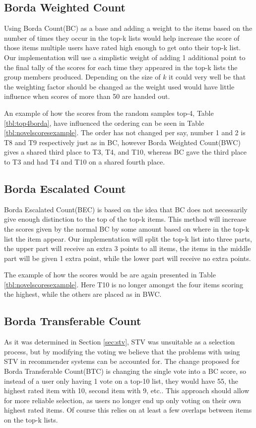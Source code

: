 \subsection{Borda Weighted Count}
Using Borda Count(BC) as a base and adding a weight to the items based on the number of times they occur in the top-k lists would help increase the score of those items multiple users have rated high enough to get onto their top-k list. Our implementation will use a simplistic weight of adding 1 additional point to the final tally of the scores for each time they appeared in the top-k lists the group members produced. Depending on the size of $k$ it could very well be that the weighting factor should be changed as the weight used would have little influence when scores of more than 50 are handed out.

An example of how the scores from the random samples top-4, Table \ref{tbl:top4borda}, have influenced the ordering can be seen in Table \ref{tbl:novelscoresexample}. The order has not changed per say, number 1 and 2 is T8 and T9 respectively just as in BC, however Borda Weighted Count(BWC) gives a shared third place to T3, T4, and T10, whereas BC gave the third place to T3 and had T4 and T10 on a shared fourth place. 

\subsection{Borda Escalated Count}
Borda Escalated Count(BEC) is based on the idea that BC does not necessarily give enough distinction to the top of the top-k items. This method will increase the scores given by the normal BC by some amount based on where in the top-k list the item appear. Our implementation will split the top-k list into three parts, the upper part will receive an extra 3 points to all items, the items in the middle part will be given 1 extra point, while the lower part will receive no extra points.

The example of how the scores would be are again presented in Table \ref{tbl:novelscoresexample}. Here T10 is no longer amongst the four items scoring the highest, while the others are placed as in BWC.

\subsection{Borda Transferable Count} \label{BTC}
As it was determined in Section \ref{sec:stv}, STV was unsuitable as a selection process, but by modifying the voting we believe that the problems with using STV in recommender systems can be accounted for. The change proposed for Borda Transferable Count(BTC) is changing the single vote into a BC score, so instead of a user only having 1 vote on a top-10 list, they would have 55, the highest rated item with 10, second item with 9, etc.. This approach should allow for more reliable selection, as users no longer end up only voting on their own highest rated items. Of course this relies on at least a few overlaps between items on the top-k lists.

